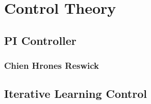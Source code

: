 \section{Control Theory}
\subsection{PI Controller}
\subsubsection{Chien Hrones Reswick}
\subsection{Iterative Learning Control}
